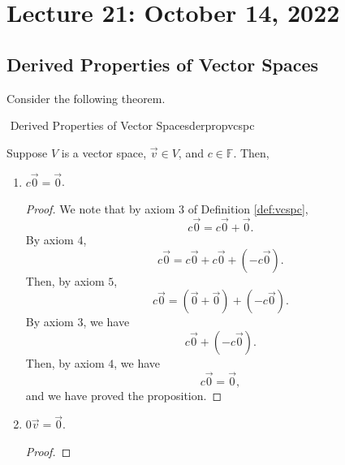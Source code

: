 \pagebreak

\section{Lecture 21: October 14, 2022}

    \subsection{Derived Properties of Vector Spaces}

        Consider the following theorem.
        \begin{theorem}{\Stop\,\,Derived Properties of Vector Spaces}{derpropvcspc}
            
            Suppose \(V\) is a vector space, \(\vec{v}\in V\), and \(c\in\mathbb{F}\). Then,
            \begin{enumerate}
                \item \(c\vec{0}=\vec{0}\).
                \begin{proof}
                    We note that by axiom \(3\) of Definition \ref{def:vcspc},
                    \begin{equation*}
                        c\vec{0}=c\vec{0}+\vec{0}.
                    \end{equation*}
                    By axiom \(4\),
                    \begin{equation*}
                        c\vec{0}=c\vec{0}+c\vec{0}+(-c\vec{0}).
                    \end{equation*}
                    Then, by axiom \(5\),
                    \begin{equation*}
                        c\vec{0}=(\vec{0}+\vec{0})+(-c\vec{0}).
                    \end{equation*}
                    By axiom \(3\), we have
                    \begin{equation*}
                        c\vec{0}+(-c\vec{0}).
                    \end{equation*}
                    Then, by axiom \(4\), we have
                    \begin{equation*}
                        c\vec{0}=\vec{0},
                    \end{equation*}
                    and we have proved the proposition.
                \end{proof}
                \item \(0\vec{v}=\vec{0}\).
                \begin{proof}

\end{proof}
\end{enumerate}
\end{theorem}

